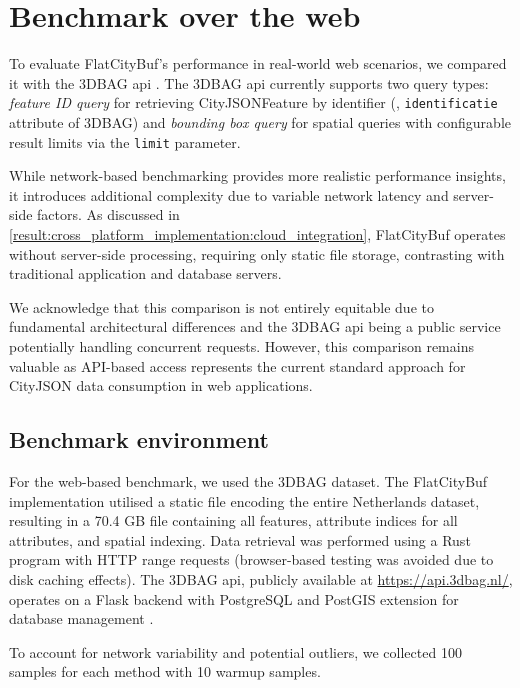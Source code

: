 \section{Benchmark over the web}
\label{result:benchmark_over_the_web}
To evaluate FlatCityBuf's performance in real-world web scenarios, we compared it with the 3DBAG \ac{api} \citep{3dbag_api}. The 3DBAG \ac{api} currently supports two query types: \textit{feature ID query} for retrieving CityJSONFeature by identifier (\eg, \texttt{identificatie} attribute of 3DBAG) and \textit{bounding box query} for spatial queries with configurable result limits via the \texttt{limit} parameter.

While network-based benchmarking provides more realistic performance insights, it introduces additional complexity due to variable network latency and server-side factors. As discussed in \autoref{result:cross_platform_implementation:cloud_integration}, FlatCityBuf operates without server-side processing, requiring only static file storage, contrasting with traditional application and database servers.

We acknowledge that this comparison is not entirely equitable due to fundamental architectural differences and the 3DBAG \ac{api} being a public service potentially handling concurrent requests. However, this comparison remains valuable as API-based access represents the current standard approach for CityJSON data consumption in web applications.

\subsection{Benchmark environment}
\label{result:benchmark_over_the_web:benchmark_environment}

For the web-based benchmark, we used the 3DBAG dataset. The FlatCityBuf implementation utilised a static file encoding the entire Netherlands dataset, resulting in a 70.4 GB file containing all features, attribute indices for all attributes, and spatial indexing. Data retrieval was performed using a Rust program with HTTP range requests (browser-based testing was avoided due to disk caching effects). The 3DBAG \ac{api}, publicly available at \url{https://api.3dbag.nl/}, operates on a Flask backend with PostgreSQL and PostGIS extension for database management \citep{powalka_2023}.

To account for network variability and potential outliers, we collected 100 samples for each method with 10 warmup samples.

